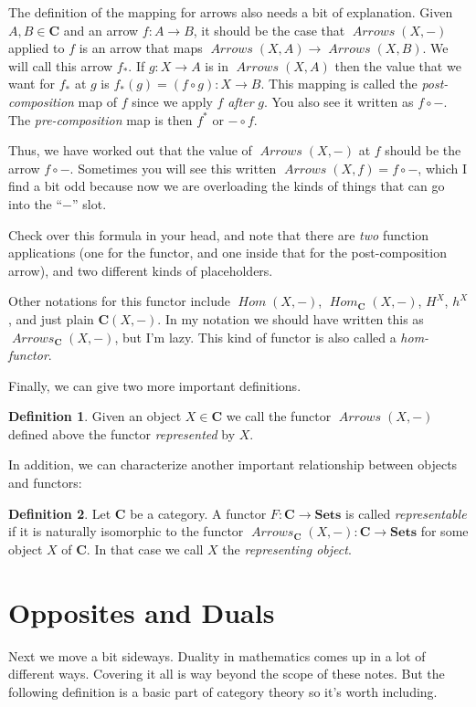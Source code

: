 \documentclass[12pt]{article}
\theoremstyle{definition}
\theoremstyle{definition}
\newtheorem{defn}{Definition}[]
\theoremstyle{definition}
\numberwithin{equation}{section}
\newcommand{\cat}[1]{\mathbf{#1}}      %
\newcommand{\fcat}[1]{{\mathbf {#1}}}    %
\newcommand{\CC}{\cat{C}}
\DeclareMathOperator{\Arrows}{\mathit{Arrows}}
\DeclareMathOperator{\Hom}{\mathit{Hom}}
\newcommand{\Set}{\fcat{Sets}}           %
\def\ni{\goodbreak\noindent}
\begin{document}
The definition of the mapping for arrows also needs a bit of explanation. Given $A,B \in
\CC$ and an arrow $f: A \to B$, it should be the case that $\Arrows(X,-)$ applied to $f$
is an arrow that maps $\Arrows(X,A) \to \Arrows(X,B)$. We will call this arrow $f_*$. If
$g: X \to A$ is in $\Arrows(X,A)$ then the value that we want for $f_*$ at $g$ is $f_*(g)
= (f \circ g): X \to B$. This mapping is called the {\it post-composition} map of $f$
since we apply $f$ {\it after} $g$. You also see it written as $f \circ -$. The {\it
pre-composition} map is then $f^*$ or $- \circ f$.

Thus, we have worked out that the value of $\Arrows(X,-)$ at $f$ should be the arrow $f
\circ -$. Sometimes you will see this written $\Arrows(X, f) = f \circ -$, which I find a
bit odd because now we are overloading the kinds of things that can go into the ``$-$''
slot.

Check over this formula in your head, and note that there are {\it two} function
applications (one for the functor, and one inside that for the post-composition arrow),
and two different kinds of placeholders.

Other notations for this functor include $\Hom(X, -)$, $\Hom_\CC(X, -)$, $H^X$, $h^X$, and
just plain $\CC(X,-)$. In my notation we should have written this as $\Arrows_{\CC}(X,
-)$, but I'm lazy. This kind of functor is also called a {\it hom-functor}.

Finally, we can give two more important definitions.
\begin{defn}
\label{represented}
Given an object $X \in \CC$ we call the functor $\Arrows(X,-)$ defined above the functor
{\it represented} by $X$.
\end{defn}
\ni
In addition, we can characterize another important relationship between objects and
functors:

\begin{defn}
 Let $\cat{C}$ be a category. A functor $F:\cat{C}\to\Set$ is called \emph{representable}
 if it is naturally isomorphic to the functor $\Arrows_\cat{C}(X,-):\cat{C}\to\Set$ for
 some object $X$ of $\cat{C}$. In that case we call $X$ the \emph{representing object}. 
\end{defn}

\section{Opposites and Duals}

Next we move a bit sideways. Duality in mathematics comes up in
a lot of different ways. Covering it all is way beyond the scope of these notes. But the
following definition is a basic part of category theory so it's worth including.
\end{document}
